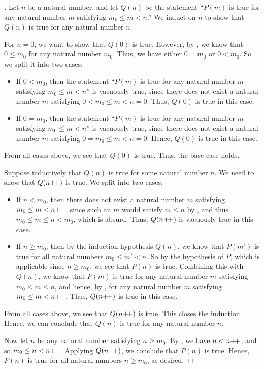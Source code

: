 \begin{proof}[]
  Let \(n\) be a natural number, and let \(Q(n)\) be the statement ``\(P(m)\) is true for any natural number \(m\) satisfying \(m_0 \leq m < n\).''
  We induct on \(n\) to show that \(Q(n)\) is true for any natural number \(n\).

  For \(n = 0\), we want to show that \(Q(0)\) is true.
  However, by , we know that \(0 \leq m_0\) for any natural number \(m_0\).
  Thus, we have either \(0 = m_0\) or \(0 < m_0\).
  So we split it into two cases:
  \begin{itemize}
    \item If \(0 < m_0\), then the statement ``\(P(m)\) is true for any natural number \(m\) satisfying \(m_0 \leq m < n\)'' is vacuously true, since there does not exist a natural number \(m\) satisfying \(0 < m_0 \leq m < n = 0\).
          Thus, \(Q(0)\) is true in this case.
    \item If \(0 = m_0\), then the statement ``\(P(m)\) is true for any natural number \(m\) satisfying \(m_0 \leq m < n\)'' is vacuously true, since there does not exist a natural number \(m\) satisfying \(0 = m_0 \leq m < n = 0\).
          Hence, \(Q(0)\) is true in this case.
  \end{itemize}
  From all cases above, we see that \(Q(0)\) is true.
  Thus, the base case holds.

  Suppose inductively that \(Q(n)\) is true for some natural number \(n\).
  We need to show that \(Q(n{+}\!{+})\) is true.
  We split into two cases:
  \begin{itemize}
    \item If \(n < m_0\), then there does not exist a natural number \(m\) satisfying \(m_0 \leq m < n{+}\!{+}\), since such an \(m\) would satisfy \(m \leq n\) by , and thus \(m_0 \leq m \leq n < m_0\), which is absurd.
          Thus, \(Q(n{+}\!{+})\) is vacuously true in this case.
    \item If \(n \geq m_0\), then by the induction hypothesis \(Q(n)\), we know that \(P(m')\) is true for all natural numbers \(m_0 \leq m' < n\).
          So by the hypothesis of \(P\), which is applicable since \(n \geq m_0\), we see that \(P(n)\) is true.
          Combining this with \(Q(n)\), we know that \(P(m)\) is true for any natural number \(m\) satisfying \(m_0 \leq m \leq n\), and hence, by , for any natural number \(m\) satisfying \(m_0 \leq m < n{+}\!{+}\).
          Thus, \(Q(n{+}\!{+})\) is true in this case.
  \end{itemize}
  From all cases above, we see that \(Q(n{+}\!{+})\) is true.
  This closes the induction.
  Hence, we can conclude that \(Q(n)\) is true for any natural number \(n\).

  Now let \(n\) be any natural number satisfying \(n \geq m_0\).
  By , we have \(n < n{+}\!{+}\), and so \(m_0 \leq n < n{+}\!{+}\).
  Applying \(Q(n{+}\!{+})\), we conclude that \(P(n)\) is true.
  Hence, \(P(n)\) is true for all natural numbers \(n \geq m_0\), as desired.
\end{proof}

